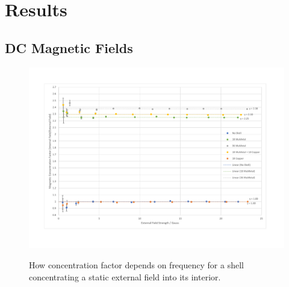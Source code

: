 \documentclass[11pt]{iopart}
\begin{document}
\section{Results}
\subsection{DC Magnetic Fields}

\begin{figure}
  \begin{center}
   \noindent\includegraphics[width=0.75\linewidth]{images/DC-graph.pdf}
  \label{fig:DC_graph}
  \end{center}
  \caption{How concentration factor depends on frequency for a shell concentrating a static external field into its interior.}
\end{figure}
\end{document}
